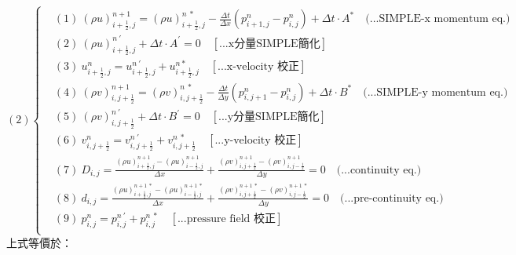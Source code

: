 \documentclass[12pt]{article}
\begin{document}
\begin{equation}
(2)
\left\{
\begin{aligned}
    &(1)\ (\rho u)_{i+\frac{1}{2},j}^{n+1} = (\rho u)_{i+\frac{1}{2},j}^{n\ *} - \frac{\Delta t}{\Delta x}(p_{i+1,j}^{n} - p_{i,j}^{n}) + \Delta t \cdot A^{*}  \quad \text{(...SIMPLE-x momentum eq.)}\\[1.5ex]
    &(2)\ (\rho u)_{i+\frac{1}{2},j}^{n\ \prime} + \Delta t \cdot A^{\prime} = 0\quad \left[\text{...x分量SIMPLE簡化}\right]\\[1.5ex]
    &(3)\ u_{i+\frac{1}{2},j}^{n} = u_{i+\frac{1}{2},j}^{n\ '} + u_{i+\frac{1}{2},j}^{n *}  \quad \left[\text{...x-velocity 校正}\right]\\[1.5ex]
    &(4)\ (\rho v)_{i,j+\frac{1}{2}}^{n+1} = (\rho v)_{i,j+\frac{1}{2}}^{n\ *} - \frac{\Delta t}{\Delta y}(p_{i,j+1}^{n} - p_{i,j}^{n}) + \Delta t \cdot B^{*}  \quad \text{(...SIMPLE-y momentum eq.)}\\[1.5ex]
    &(5)\ (\rho v)_{i,j+\frac{1}{2}}^{n\ \prime} + \Delta t \cdot B^{\prime} = 0 \quad\left[\text{...y分量SIMPLE簡化}\right]\\[1.5ex]
    &(6)\ v_{i,j+\frac{1}{2}}^{n} = v_{i,j+\frac{1}{2}}^{n\ \prime} + v_{i,j+\frac{1}{2}}^{n\ *} \quad \left[\text{...y-velocity 校正}\right]\\[1.5ex]
    &(7)\ D_{i,j} = \frac{(\rho u)_{i+\frac{1}{2},j}^{n+1} - (\rho u)_{i-\frac{1}{2},j}^{n+1}}{\Delta x} + \frac{(\rho v)_{i,j+\frac{1}{2}}^{n+1} - (\rho v)_{i,j-\frac{1}{2}}^{n+1}}{\Delta y} = 0 \quad \text{(...continuity eq.)}\\[1.5ex]
    &(8)\ d_{i,j} = \frac{(\rho u)_{i+\frac{1}{2},j}^{n+1\ *} - (\rho u)_{i-\frac{1}{2},j}^{n+1\ *}}{\Delta x} + \frac{(\rho v)_{i,j+\frac{1}{2}}^{n+1\ *} - (\rho v)_{i,j-\frac{1}{2}}^{n+1\ *}}{\Delta y} = 0 \quad \text{(...pre-continuity eq.)}\\[1.5ex]
    &(9)\ p_{i,j}^{n} = p_{i,j}^{n\ \prime} + p_{i,j}^{n\ *} \quad\left[\text{...pressure field 校正}\right]\\[1.5ex]
\end{aligned}
\right.
\end{equation}
\noindent 上式等價於：\\
\end{document}
